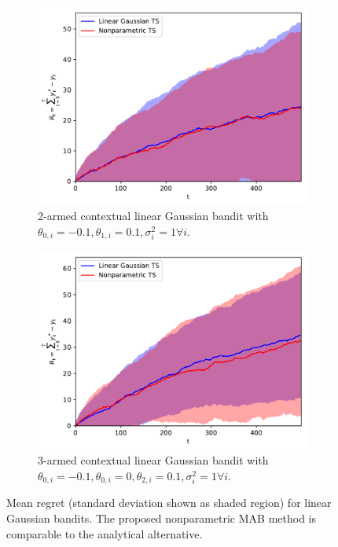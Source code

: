 \documentclass{article}
\begin{document}
\begin{figure}[!ht]
	\centering
	\begin{subfigure}[b]{0.48\textwidth}
		\includegraphics[width=\textwidth]{./figs/linearGaussian/cumregret_A2_-01_-01_01_01_1_1}
		\caption{2-armed contextual linear Gaussian bandit with $\theta_{0,i}=-0.1, \theta_{1,i}=0.1, \sigma_i^2=1 \forall i$.}
		\label{fig:linear_gaussian_A2_01}
	\end{subfigure} \quad 
	\begin{subfigure}[b]{0.48\textwidth}
		\includegraphics[width=\textwidth]{./figs/linearGaussian/cumregret_A3_-01_-01_0_0_01_01_1_1_1}
		\caption{3-armed contextual linear Gaussian bandit with $\theta_{0,i}=-0.1, \theta_{0,i}=0, \theta_{2,i}=0.1, \sigma_i^2=1 \forall i$.}
		\label{fig:linear_gaussian_A3_01}
	\end{subfigure}
	\caption{Mean regret (standard deviation shown as shaded region) for linear Gaussian bandits. The proposed nonparametric MAB method is comparable to the analytical alternative.}
	\label{fig:linear_gaussian}
\end{figure}
\end{document}
